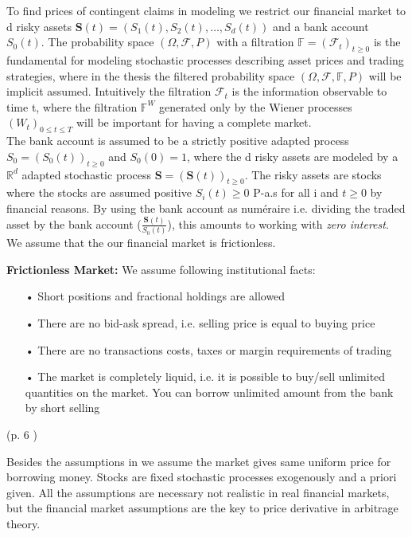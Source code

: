 To find prices of contingent claims in modeling we restrict our financial market to d risky assets $\bm{S}(t)=(S_1(t), S_2(t),\ldots, S_d(t))$ and a bank account $S_0(t)$. The probability space $(\Omega, \mathcal{F}, P)$ with a filtration $\mathbb{F}=(\mathcal{F}_t)_{t\geq 0}$ is the fundamental for modeling stochastic processes describing asset prices and trading strategies, where in the thesis the filtered probability space $(\Omega, \mathcal{F}, \mathbb{F}, P)$ will be implicit assumed. Intuitively the filtration $\mathcal{F}_t$ is the information observable to time t, where the filtration $\mathbb{F}^{W}$ generated only by the Wiener processes $(W_t)_{0\leq t \leq T}$ will be important for having a complete market.\\

The bank account is assumed to be a strictly positive adapted process $S_0=(S_0 (t))_{t \geq 0}$ and $S_0(0)=1$, where the d risky assets are modeled by a $\mathbb{R}^d$ adapted stochastic process $\bm{S}=(\bm{S}(t))_{t\geq 0}$. The risky assets are stocks where the stocks are assumed positive $S_i(t)\geq 0$ P-a.s for all i and $t\geq 0$ by financial reasons. By using the bank account as numéraire i.e. dividing the traded asset by the bank account ($\frac{\bm{S}(t)}{S_0 (t)}$), this amounts to working with \textit{zero interest}. We assume that the our financial market is frictionless.
\theoremstyle{assumption}
\begin{assumption}{\textbf{Frictionless Market: }}\label{EfficientMarket}
We assume following institutional facts:
\begin{enumerate}
\item[•] Short positions and fractional holdings are allowed
\item[•] There are no bid-ask spread, i.e. selling price is equal to buying price
\item[•] There are no transactions costs, taxes or margin requirements of trading
\item[•] The market is completely liquid, i.e. it is possible to buy/sell unlimited quantities on the market. You can borrow unlimited amount from the bank by short selling
\end{enumerate}
\hfill (p. 6 \parencite{finKont})
\end{assumption}
Besides the assumptions in \parencite{finKont} we assume the market gives same uniform price for borrowing money. Stocks are fixed stochastic processes exogenously and a priori given. All the assumptions are necessary not realistic in real financial markets, but the financial market assumptions are the key to price derivative in arbitrage theory.

